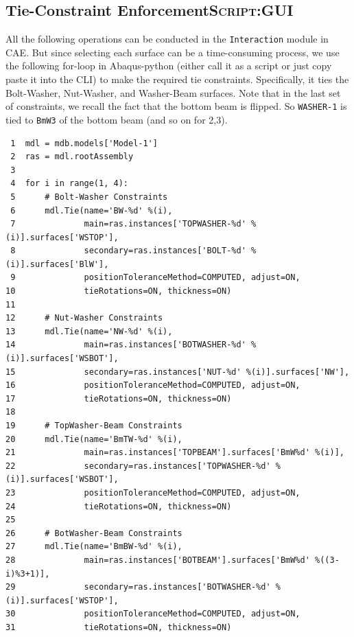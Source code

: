 \documentclass[11pt]{article}
\begin{document}
\subsection{Tie-Constraint Enforcement\hfill{}\textsc{Script:GUI}}
\label{sec:org4bcdb79}
All the following operations can be conducted in the \texttt{Interaction} module in CAE.
But since selecting each surface can be a time-consuming process, we use the following for-loop in Abaqus-python (either call it as a script or just copy paste it into the CLI) to make the required tie constraints.
Specifically, it ties the Bolt-Washer, Nut-Washer, and Washer-Beam surfaces.
Note that in the last set of constraints, we recall the fact that the bottom beam is flipped.
So \texttt{WASHER-1} is tied to \texttt{BmW3} of the bottom beam (and so on for 2,3).
\begin{verbatim}
 1  mdl = mdb.models['Model-1']
 2  ras = mdl.rootAssembly
 3  
 4  for i in range(1, 4):
 5      # Bolt-Washer Constraints
 6      mdl.Tie(name='BW-%d' %(i),
 7              main=ras.instances['TOPWASHER-%d' %(i)].surfaces['WSTOP'],
 8              secondary=ras.instances['BOLT-%d' %(i)].surfaces['BlW'],
 9              positionToleranceMethod=COMPUTED, adjust=ON,
10              tieRotations=ON, thickness=ON)
11  
12      # Nut-Washer Constraints
13      mdl.Tie(name='NW-%d' %(i),
14              main=ras.instances['BOTWASHER-%d' %(i)].surfaces['WSBOT'],
15              secondary=ras.instances['NUT-%d' %(i)].surfaces['NW'],
16              positionToleranceMethod=COMPUTED, adjust=ON,
17              tieRotations=ON, thickness=ON)
18  
19      # TopWasher-Beam Constraints
20      mdl.Tie(name='BmTW-%d' %(i),
21              main=ras.instances['TOPBEAM'].surfaces['BmW%d' %(i)],
22              secondary=ras.instances['TOPWASHER-%d' %(i)].surfaces['WSBOT'],
23              positionToleranceMethod=COMPUTED, adjust=ON,
24              tieRotations=ON, thickness=ON)
25  
26      # BotWasher-Beam Constraints
27      mdl.Tie(name='BmBW-%d' %(i),
28              main=ras.instances['BOTBEAM'].surfaces['BmW%d' %((3-i)%3+1)],
29              secondary=ras.instances['BOTWASHER-%d' %(i)].surfaces['WSTOP'],
30              positionToleranceMethod=COMPUTED, adjust=ON,
31              tieRotations=ON, thickness=ON)
\end{verbatim}
\end{document}
